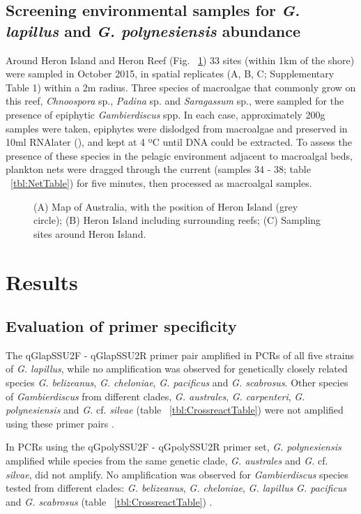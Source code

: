 \documentclass[12pt]{article}
\begin{document}
\subsection*{Screening environmental samples for \emph{G. lapillus} and \emph{G. polynesiensis} abundance}
Around Heron Island and Heron Reef (Fig. ~\ref{fig:samplesites}) 33 sites (within 1km of the shore) were sampled in October 2015, in spatial replicates (A, B, C; Supplementary Table 1) within a 2m radius. Three species of macroalgae that commonly grow on this reef, \textit{Chnoospora} sp., \textit{Padina} sp. and \textit{Saragassum} sp., were sampled for the presence of epiphytic \emph{Gambierdiscus} spp. In each case, approximately 200g samples were taken, epiphytes were dislodged from macroalgae and preserved in 10ml RNAlater (), and kept at 4 ºC until DNA could be extracted.
To assess the presence of these species in the pelagic environment adjacent to macroalgal beds, plankton nets were dragged through the current (samples 34 - 38; table ~\ref{tbl:NetTable}) for five minutes, then processed as macroalgal samples.

\FloatBarrier 
\begin{figure} 
\caption{(A) Map of Australia, with the position of Heron Island (grey circle); (B) Heron Island including surrounding reefs; (C) Sampling sites around Heron Island.} 
\label{fig:samplesites}
\end{figure} 
\FloatBarrier

\newpage
\section*{Results}
\subsection*{Evaluation of primer specificity}
The qGlapSSU2F - qGlapSSU2R primer pair amplified in PCRs of all five strains of \emph{G. lapillus}, while no amplification was observed for genetically closely related species \emph{G. belizeanus}, \emph{G. cheloniae}, \emph{G. pacificus} and \emph{G. scabrosus}. Other species of \emph{Gambierdiscus} from different clades, \emph{G. australes}, \emph{G. carpenteri}, \emph{G. polynesiensis} and \emph{G.} cf. \emph{silvae} (table ~\ref{tbl:CrossreactTable}) were not amplified using these primer pairs \cite{smith2016new,kretzschmar2016characterization}.

In PCRs using the qGpolySSU2F - qGpolySSU2R primer set, \emph{G. polynesiensis} amplified while species from the same genetic clade, \emph{G. australes} and \emph{G.} cf. \emph{silvae}, did not amplify. No amplification was observed for \emph{Gambierdiscus} species tested from different clades: \emph{G. belizeanus}, \emph{G. cheloniae}, \emph{G. lapillus }\emph{G. pacificus} and \emph{G. scabrosus} (table ~\ref{tbl:CrossreactTable}) \cite{kretzschmar2016characterization}.
\end{document}
